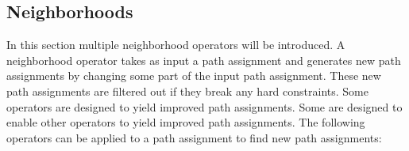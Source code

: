 \subsection{Neighborhoods}

\label{sec:neighborhood}

In this section multiple neighborhood operators will be introduced.
A neighborhood operator takes as input a path assignment and generates new path assignments by changing some part of the input path assignment.
These new path assignments are filtered out if they break any hard constraints.
Some operators are designed to yield improved path assignments.
Some are designed to enable other operators to yield improved path assignments.
%
The following operators
can be applied to a path assignment to find new path assignments:
